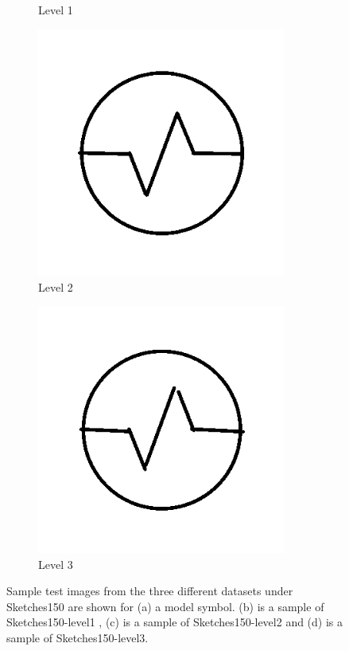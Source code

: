 \begin{figure}[h]
\begin{subfigure}[b]{0.25\textwidth}
                \caption{Level 1}
        \end{subfigure}
                \begin{subfigure}[b]{0.25\textwidth}
                \centering
                \includegraphics[width=0.9\textwidth]{figures/Results/Sketches150/level2.png}
                \caption{Level 2}
        \end{subfigure}
                \begin{subfigure}[b]{0.25\textwidth}
                \centering
                \includegraphics[width=0.9\textwidth]{figures/Results/Sketches150/level3.png}
                \caption{Level 3}
        \end{subfigure}
        \caption[Sample data from 'Sketches150' dataset]{Sample test images from the three different datasets under Sketches150 are shown for (a) a model symbol. (b) is a sample of Sketches150-level1 , (c)  is a sample of Sketches150-level2 and (d) is a sample of Sketches150-level3.}
        \label{fig:Sketches150Examples}
\end{figure}

